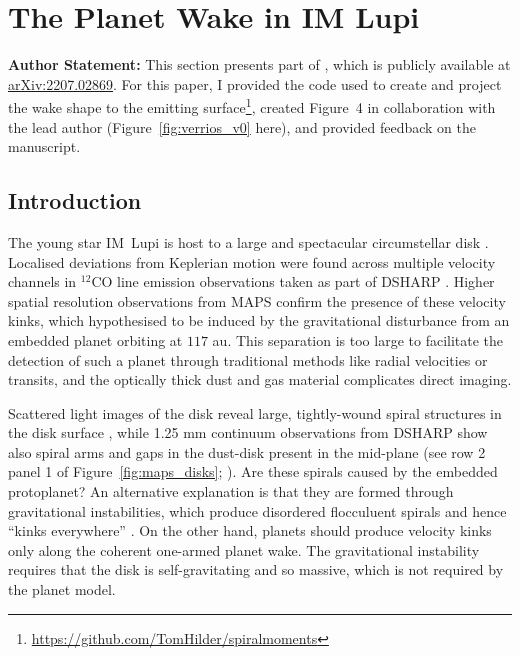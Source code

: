 \section{The Planet Wake in IM Lupi} \label{sec:IMLupiwake}

\textbf{Author Statement:} This section presents part of \citet{verrios2022}, which is publicly available at \href{https://arxiv.org/abs/2207.02869}{\url{arXiv:2207.02869}}.
For this paper, I provided the code used to create and project the wake shape to the emitting surface\footnote{\url{https://github.com/TomHilder/spiralmoments}}, created Figure~4 in collaboration with the lead author (Figure~\ref{fig:verrios_v0} here), and provided feedback on the manuscript.

\subsection{Introduction}

The young star IM~Lupi is host to a large and spectacular circumstellar disk \citep{panic2009,avenhaus2018,cleeves2016,pinte2018}.
Localised deviations from Keplerian motion were found across multiple velocity channels in $^{12}$CO line emission observations \citep{pinte2020} taken as part of DSHARP \citep{huang2018,andrews2018}.
Higher spatial resolution observations from MAPS \citep{oberg2021} confirm the presence of these velocity kinks, which \citet{pinte2020} hypothesised to be induced by the gravitational disturbance from an embedded planet orbiting at $117$ au.
This separation is too large to facilitate the detection of such a planet through traditional methods like radial velocities or transits, and the optically thick dust and gas material complicates direct imaging.

Scattered light images of the disk reveal large, tightly-wound spiral structures in the disk surface \citep[see Figure~\ref{fig:im_lup};][]{avenhaus2018},
while 1.25 mm continuum observations from DSHARP show also spiral arms and gaps in the dust-disk present in the mid-plane (see row 2 panel 1 of Figure~\ref{fig:maps_disks}; \citealt{huang2018}).
Are these spirals caused by the embedded protoplanet?
An alternative explanation is that they are formed through gravitational instabilities, which produce disordered flocculuent spirals and hence ``kinks everywhere'' \citep{hall2020}.
On the other hand, planets should produce velocity kinks only along the coherent one-armed planet wake.
The gravitational instability requires that the disk is self-gravitating and so massive, which is not required by the planet model.

